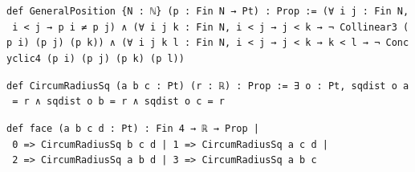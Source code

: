 \documentclass[11pt,a4paper]{article}
\theoremstyle{named}
\begin{document}
\begin{leancode}
\item \texttt{def\ \allowbreak{}GeneralPosition\ \allowbreak{}\{N\ \allowbreak{}:\ \allowbreak{}ℕ\}\ \allowbreak{}(p\ \allowbreak{}:\ \allowbreak{}Fin\ \allowbreak{}N\ \allowbreak{}→\ \allowbreak{}Pt)\ \allowbreak{}:\ \allowbreak{}Prop\ \allowbreak{}:=\ \allowbreak{}(∀\ \allowbreak{}i\ \allowbreak{}j\ \allowbreak{}:\ \allowbreak{}Fin\ \allowbreak{}N,\ \allowbreak{}i\ \allowbreak{}\textless{}\ \allowbreak{}j\ \allowbreak{}→\ \allowbreak{}p\ \allowbreak{}i\ \allowbreak{}≠\ \allowbreak{}p\ \allowbreak{}j)\ \allowbreak{}∧\ \allowbreak{}(∀\ \allowbreak{}i\ \allowbreak{}j\ \allowbreak{}k\ \allowbreak{}:\ \allowbreak{}Fin\ \allowbreak{}N,\ \allowbreak{}i\ \allowbreak{}\textless{}\ \allowbreak{}j\ \allowbreak{}→\ \allowbreak{}j\ \allowbreak{}\textless{}\ \allowbreak{}k\ \allowbreak{}→\ \allowbreak{}¬\ \allowbreak{}Collinear3\ \allowbreak{}(p\ \allowbreak{}i)\ \allowbreak{}(p\ \allowbreak{}j)\ \allowbreak{}(p\ \allowbreak{}k))\ \allowbreak{}∧\ \allowbreak{}(∀\ \allowbreak{}i\ \allowbreak{}j\ \allowbreak{}k\ \allowbreak{}l\ \allowbreak{}:\ \allowbreak{}Fin\ \allowbreak{}N,\ \allowbreak{}i\ \allowbreak{}\textless{}\ \allowbreak{}j\ \allowbreak{}→\ \allowbreak{}j\ \allowbreak{}\textless{}\ \allowbreak{}k\ \allowbreak{}→\ \allowbreak{}k\ \allowbreak{}\textless{}\ \allowbreak{}l\ \allowbreak{}→\ \allowbreak{}¬\ \allowbreak{}Concyclic4\ \allowbreak{}(p\ \allowbreak{}i)\ \allowbreak{}(p\ \allowbreak{}j)\ \allowbreak{}(p\ \allowbreak{}k)\ \allowbreak{}(p\ \allowbreak{}l))}
\item \texttt{def\ \allowbreak{}CircumRadiusSq\ \allowbreak{}(a\ \allowbreak{}b\ \allowbreak{}c\ \allowbreak{}:\ \allowbreak{}Pt)\ \allowbreak{}(r\ \allowbreak{}:\ \allowbreak{}ℝ)\ \allowbreak{}:\ \allowbreak{}Prop\ \allowbreak{}:=\ \allowbreak{}∃\ \allowbreak{}o\ \allowbreak{}:\ \allowbreak{}Pt,\ \allowbreak{}sqdist\ \allowbreak{}o\ \allowbreak{}a\ \allowbreak{}=\ \allowbreak{}r\ \allowbreak{}∧\ \allowbreak{}sqdist\ \allowbreak{}o\ \allowbreak{}b\ \allowbreak{}=\ \allowbreak{}r\ \allowbreak{}∧\ \allowbreak{}sqdist\ \allowbreak{}o\ \allowbreak{}c\ \allowbreak{}=\ \allowbreak{}r}
\item \texttt{def\ \allowbreak{}face\ \allowbreak{}(a\ \allowbreak{}b\ \allowbreak{}c\ \allowbreak{}d\ \allowbreak{}:\ \allowbreak{}Pt)\ \allowbreak{}:\ \allowbreak{}Fin\ \allowbreak{}4\ \allowbreak{}→\ \allowbreak{}ℝ\ \allowbreak{}→\ \allowbreak{}Prop\ \allowbreak{}|\ \allowbreak{}0\ \allowbreak{}=\textgreater{}\ \allowbreak{}CircumRadiusSq\ \allowbreak{}b\ \allowbreak{}c\ \allowbreak{}d\ \allowbreak{}|\ \allowbreak{}1\ \allowbreak{}=\textgreater{}\ \allowbreak{}CircumRadiusSq\ \allowbreak{}a\ \allowbreak{}c\ \allowbreak{}d\ \allowbreak{}|\ \allowbreak{}2\ \allowbreak{}=\textgreater{}\ \allowbreak{}CircumRadiusSq\ \allowbreak{}a\ \allowbreak{}b\ \allowbreak{}d\ \allowbreak{}|\ \allowbreak{}3\ \allowbreak{}=\textgreater{}\ \allowbreak{}CircumRadiusSq\ \allowbreak{}a\ \allowbreak{}b\ \allowbreak{}c}

\end{leancode}
\end{document}
